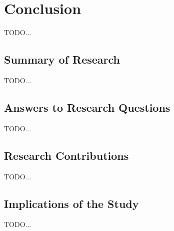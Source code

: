 \chapter{Conclusion}
\label{sec:Conclusion}
\label{Chapter5} %

TODO...

\section{Summary of Research}
TODO...

\section{Answers to Research Questions}
TODO...

\section{Research Contributions}
TODO...

\section{Implications of the Study}
TODO...

